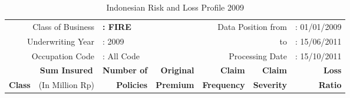 \documentclass[12pt,letterpaper]{article}
\begin{document}
\begin{table}[h]
\begin{center}
\caption{Indonesian Risk and Loss Profile 2009}\label{T:BasicData}
\begin{tabular}{rrrrrrrr}
\hline
\multicolumn{3}{r}{Class of Business} &      \multicolumn{1}{l}{{\bf : FIRE}} & \multicolumn{3}{r}{{ Data Position from}} & { : 01/01/2009} \\

\multicolumn{3}{r}{Underwriting Year} &  \multicolumn{1}{l}{{: 2009}} &    \multicolumn{3}{r}{{ to}} &     { : 15/06/2011} \\

\multicolumn{3}{r}{Occupation Code} & \multicolumn{1}{l}{{: All Code}} &   \multicolumn{3}{r}{{ Processing Date}} & {: 15/10/2011} \\

\hline
           & \multicolumn{ 2}{c}{{\bf Sum Insured}} &  {\bf Number of} & {\bf Original} &  {\bf Claim} & {\bf Claim} &   {\bf Loss} \\

{\bf Class} & \multicolumn{ 2}{c}{{ (In Million Rp)}} & {\bf Policies}& {\bf Premium} & {\bf Frequency} & {\bf Severity}  &
{\bf Ratio} \\


\end{tabular}
\end{center}
\end{table}
\end{document}
